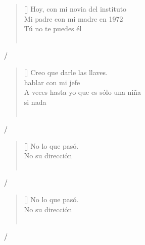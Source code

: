 \documentclass[grid,avery5371]{flashcards}
\begin{document}
\begin{flashcard}{%
\begin{verse}[\versewidth]
Hoy,  con mi novia del instituto\\
Mi padre  con mi madre en 1972\\
Tú no te puedes  él\\
\hfill \\
\end{verse}
\hfill \break

}

  /    
\end{flashcard}

\begin{flashcard}{%
\begin{verse}[\versewidth]
Creo que  darle las llaves.\\
 hablar con mi jefe \\
A veces hasta yo  que es sólo una niña\\
si  nada\\
\hfill \\
\end{verse}
\hfill \break
}
  /    
\end{flashcard}


\begin{flashcard}{%
\begin{verse}[\versewidth]
No  lo que pasó. \\
No  su dirección \\
\hfill \\
\end{verse}
\hfill \break
}
  /    \end{flashcard}

\begin{flashcard}{%
\begin{verse}[\versewidth]
No  lo que pasó. \\
No  su dirección \\
\hfill \\
\end{verse}
\hfill \break
}
  /    \end{flashcard}
\end{document}
